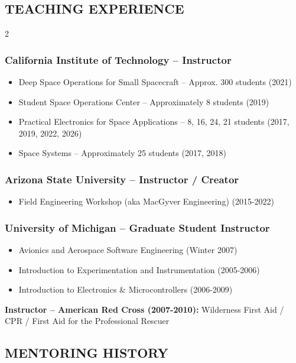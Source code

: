 \documentclass[11pt,letterpaper]{article}
\begin{document}
\subsection*{TEACHING EXPERIENCE}
\begin{multicols}{2}
\subsubsection*{California Institute of Technology – Instructor}
\begin{itemize}
\item Deep Space Operations for Small Spacecraft – Approx. 300 students (2021)
\item Student Space Operations Center – Approximately 8 students (2019)
\item Practical Electronics for Space Applications – 8, 16, 24, 21 students (2017, 2019, 2022, 2026)
\item Space Systems – Approximately 25 students (2017, 2018)
\end{itemize}

\subsubsection*{Arizona State University – Instructor / Creator}
\begin{itemize}
\item Field Engineering Workshop (aka MacGyver Engineering) (2015-2022)
\end{itemize}

\subsubsection*{University of Michigan – Graduate Student Instructor}
\begin{itemize}
\item Avionics and Aerospace Software Engineering (Winter 2007)
\item Introduction to Experimentation and Instrumentation (2005-2006)
\item Introduction to Electronics \& Microcontrollers (2006-2009)
\end{itemize}

\textbf{Instructor – American Red Cross (2007-2010):} Wilderness First Aid / CPR / First Aid for the Professional Rescuer

\end{multicols}
\subsection*{MENTORING HISTORY}
\end{document}
